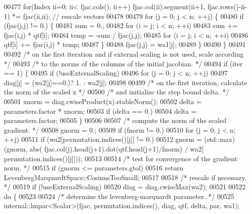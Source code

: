 \begin{DoxyCode}
00477         \textcolor{keywordflow}{for}(Index ii=0; ii< fjac.cols(); ii++) fjac.col(ii).segment(ii+1, fjac.rows()-ii-1) *= fjac(ii,ii);
       \textcolor{comment}{// rescale vectors}
00478 
00479         \textcolor{keywordflow}{for} (j = 0; j < n; ++j) \{
00480             \textcolor{keywordflow}{if} (fjac(j,j) != 0.) \{
00481                 sum = 0.;
00482                 \textcolor{keywordflow}{for} (i = j; i < n; ++i)
00483                     sum += fjac(i,j) * qtf[i];
00484                 temp = -sum / fjac(j,j);
00485                 \textcolor{keywordflow}{for} (i = j; i < n; ++i)
00486                     qtf[i] += fjac(i,j) * temp;
00487             \}
00488             fjac(j,j) = wa1[j];
00489         \}
00490     \}
00491 
00492     \textcolor{comment}{/* on the first iteration and if external scaling is not used, scale according */}
00493     \textcolor{comment}{/* to the norms of the columns of the initial jacobian. */}
00494     \textcolor{keywordflow}{if} (iter == 1) \{
00495         \textcolor{keywordflow}{if} (!useExternalScaling)
00496             \textcolor{keywordflow}{for} (j = 0; j < n; ++j)
00497                 diag[j] = (wa2[j]==0.)? 1. : wa2[j];
00498 
00499         \textcolor{comment}{/* on the first iteration, calculate the norm of the scaled x */}
00500         \textcolor{comment}{/* and initialize the step bound delta. */}
00501         xnorm = diag.cwiseProduct(x).stableNorm();
00502         delta = parameters.factor * xnorm;
00503         \textcolor{keywordflow}{if} (delta == 0.)
00504             delta = parameters.factor;
00505     \}
00506 
00507     \textcolor{comment}{/* compute the norm of the scaled gradient. */}
00508     gnorm = 0.;
00509     \textcolor{keywordflow}{if} (fnorm != 0.)
00510         \textcolor{keywordflow}{for} (j = 0; j < n; ++j)
00511             \textcolor{keywordflow}{if} (wa2[permutation.indices()[j]] != 0.)
00512                 gnorm = (std::max)(gnorm, abs( fjac.col(j).head(j+1).dot(qtf.head(j+1)/fnorm) / wa2[
      permutation.indices()[j]]));
00513 
00514     \textcolor{comment}{/* test for convergence of the gradient norm. */}
00515     \textcolor{keywordflow}{if} (gnorm <= parameters.gtol)
00516         \textcolor{keywordflow}{return} LevenbergMarquardtSpace::CosinusTooSmall;
00517 
00518     \textcolor{comment}{/* rescale if necessary. */}
00519     \textcolor{keywordflow}{if} (!useExternalScaling)
00520         diag = diag.cwiseMax(wa2);
00521 
00522     \textcolor{keywordflow}{do} \{
00523 
00524         \textcolor{comment}{/* determine the levenberg-marquardt parameter. */}
00525         internal::lmpar<Scalar>(fjac, permutation.indices(), diag, qtf, delta, par, wa1);

\end{DoxyCode}
